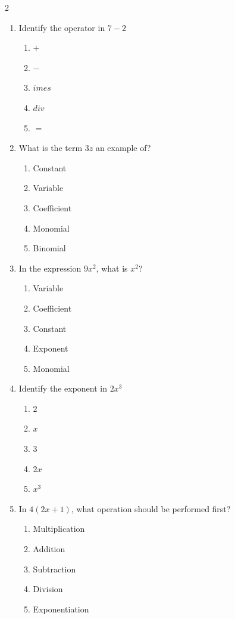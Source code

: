 \documentclass[10pt]{article}
\begin{document}
\begin{multicols}{2}
\begin{enumerate}[label=\textbf{Q\arabic*.}, leftmargin=*, itemsep=6pt, parsep=0pt]
  \item \small Identify the operator in $7 - 2$
  \begin{enumerate}[label=(\Alph*), leftmargin=0.6cm, nosep, itemsep=2pt]
    \item $+$
    \item $-$
    \item $	imes$
    \item $div$
    \item $=$
  \end{enumerate}

  \item \small What is the term $3z$ an example of?
  \begin{enumerate}[label=(\Alph*), leftmargin=0.6cm, nosep, itemsep=2pt]
    \item Constant
    \item Variable
    \item Coefficient
    \item Monomial
    \item Binomial
  \end{enumerate}

  \item \small In the expression $9x^2$, what is $x^2$?
  \begin{enumerate}[label=(\Alph*), leftmargin=0.6cm, nosep, itemsep=2pt]
    \item Variable
    \item Coefficient
    \item Constant
    \item Exponent
    \item Monomial
  \end{enumerate}

  \item \small Identify the exponent in $2x^3$
  \begin{enumerate}[label=(\Alph*), leftmargin=0.6cm, nosep, itemsep=2pt]
    \item $2$
    \item $x$
    \item $3$
    \item $2x$
    \item $x^3$
  \end{enumerate}

  \item \small In $4(2x + 1)$, what operation should be performed first?
  \begin{enumerate}[label=(\Alph*), leftmargin=0.6cm, nosep, itemsep=2pt]
    \item Multiplication
    \item Addition
    \item Subtraction
    \item Division
    \item Exponentiation
  \end{enumerate}

\end{enumerate}
\end{multicols}
\end{document}

